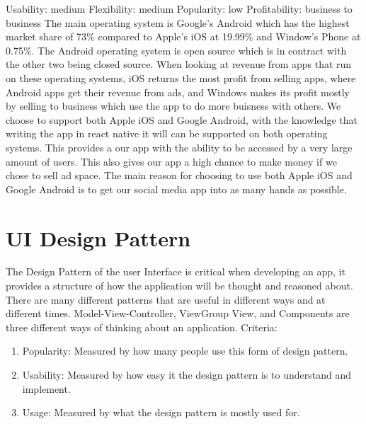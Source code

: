 \documentclass[letterpaper, 10, draftclsnofoot, onecolumn]{IEEEtran}
\begin{document}
\newline
\newline
Usability: medium
\newline
Flexibility: medium
\newline
Popularity: low
\newline
Profitability: business to business
\newline
\newline
\indent The main operating system is Google’s Android which has the highest market share of 73\% compared to Apple’s iOS at 19.99\% and Window’s Phone at 0.75\%. The Android operating system is open source which is in contract with the other two being closed source. When looking at revenue from apps that run on these operating systems, iOS returns the most profit from selling apps, where Android apps get their revenue from ads, and Windows makes its profit mostly by selling to business which use the app to do more buisness with others. 
\newline
\indent We choose to support both Apple iOS and Google Android, with the knowledge that writing the app in react native it will can be supported on both operating systems. This provides a our app with the ability to be accessed by a very large amount of users. This also gives our app a high chance to make money if we chose to sell ad space. The main reason for choosing to use both Apple iOS and Google Android is to get our social media app into as many hands as possible. 

\section*{UI Design Pattern}\par
\indent The Design Pattern of the user Interface is critical when developing an app, it provides a structure of how the application will be thought and reasoned about. There are many different patterns that are useful in different ways and at different times. Model-View-Controller, ViewGroup View, and Components are three different ways of thinking about an application. 
\newline
Criteria:
\begin{enumerate}
\item Popularity: Measured by how many people use this form of design pattern.
\item Usability: Measured by how easy it the design pattern is to understand and implement. 
\item Usage: Measured by what the design pattern is mostly used for.
\end{enumerate}
\end{document}
